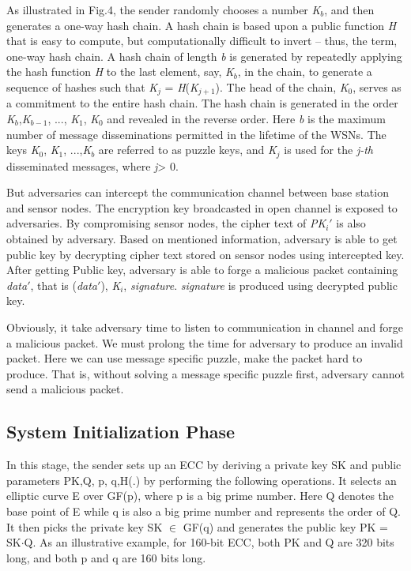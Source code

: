 \documentclass{sig-alternate-05-2015}
\begin{document}
As illustrated in Fig.4, the sender randomly chooses a number \emph{K$_b$}, and then generates a one-way hash chain. A hash chain is based upon a public function \emph{H} that is easy to compute, but computationally difficult to invert -- thus, the term, one-way hash chain. A hash chain of length \emph{b} is generated by repeatedly applying the hash function \emph{H} to the last element, say, \emph{K$_b$}, in the chain, to generate a sequence of hashes such that \emph{K$_j$} = \emph{H}(\emph{K$_{j+1}$}). The head of the chain, \emph{K$_0$}, serves as a commitment to the entire hash chain. The hash chain is generated in the order \emph{K$_b$},\emph{K$_{b-1}$}, ..., \emph{K$_1$}, \emph{K$_0$} and revealed in the reverse order. Here \emph{b} is the maximum number of message disseminations permitted in the lifetime of the WSNs. The keys \emph{K$_0$}, \emph{K$_1$}, ...,\emph{K$_b$} are referred to as puzzle keys, and \emph{K$_j$} is used for the \emph{j-th} disseminated messages, where \emph{j}> 0.


But adversaries can intercept the communication channel between base station and sensor nodes. The encryption key broadcasted in open channel is exposed to adversaries. By compromising sensor nodes, the cipher text of \emph{PK$_i '$} is also obtained by adversary. Based on mentioned information, adversary is able to get public key by decrypting cipher text stored on sensor nodes using intercepted key. After getting Public key, adversary is able to forge a malicious packet containing \emph{data}$'$, that is (\emph{data}$'$), \emph{K$_i$}, \emph{signature}. \emph{signature} is produced using decrypted public key.
		
		Obviously, it take adversary time to listen to communication in channel and forge a malicious packet. 
		We must prolong the time for adversary to produce an invalid packet. Here we can use message specific puzzle, make the packet hard to produce. That is, without solving a message specific puzzle first, adversary cannot send a malicious packet.

\subsection{System Initialization Phase}
In this stage, the sender sets up an ECC by deriving a private key SK and public parameters {PK,Q, p, q,H(.)} by performing the following operations. It selects an elliptic curve E over GF(p), where p is a big prime number. Here Q denotes the base point of E while q is also a big prime number and  represents the order of Q. It then picks the private key SK $\in$ GF(q) and generates the public key PK = SK$\cdot$Q. As an illustrative example, for 160-bit ECC, both PK and Q are 320 bits long, and both p and q are 160 bits long.
\end{document}
